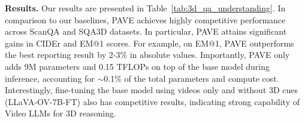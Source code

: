 \medskip
\noindent\textbf{Results.} Our results are presented in Table~\ref{tab:3d_qa_understanding}. In comparison to our baselines, PAVE achieves highly competitive performance across ScanQA and SQA3D datasets. In particular, PAVE attains significant gains in CIDEr and EM@1 scores. For example, on EM@1, PAVE outperforms the best reporting result by 2-3\% in absolute values. Importantly, PAVE only adds 9M parameters and 0.15 TFLOPs on top of the base model during inference, accounting for $\sim$0.1\% of the total parameters and compute cost. Interestingly, fine-tuning the base model using videos only and without 3D cues (LLaVA-OV-7B-FT) also has competitive results, indicating strong capability of Video LLMs for 3D reasoning. 










